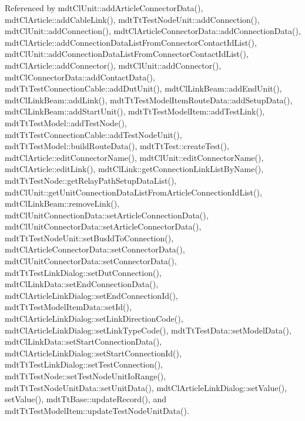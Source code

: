 Referenced by mdt\-Cl\-Unit\-::add\-Article\-Connector\-Data(), mdt\-Cl\-Article\-::add\-Cable\-Link(), mdt\-Tt\-Test\-Node\-Unit\-::add\-Connection(), mdt\-Cl\-Unit\-::add\-Connection(), mdt\-Cl\-Article\-Connector\-Data\-::add\-Connection\-Data(), mdt\-Cl\-Article\-::add\-Connection\-Data\-List\-From\-Connector\-Contact\-Id\-List(), mdt\-Cl\-Unit\-::add\-Connection\-Data\-List\-From\-Connector\-Contact\-Id\-List(), mdt\-Cl\-Article\-::add\-Connector(), mdt\-Cl\-Unit\-::add\-Connector(), mdt\-Cl\-Connector\-Data\-::add\-Contact\-Data(), mdt\-Tt\-Test\-Connection\-Cable\-::add\-Dut\-Unit(), mdt\-Cl\-Link\-Beam\-::add\-End\-Unit(), mdt\-Cl\-Link\-Beam\-::add\-Link(), mdt\-Tt\-Test\-Model\-Item\-Route\-Data\-::add\-Setup\-Data(), mdt\-Cl\-Link\-Beam\-::add\-Start\-Unit(), mdt\-Tt\-Test\-Model\-Item\-::add\-Test\-Link(), mdt\-Tt\-Test\-Model\-::add\-Test\-Node(), mdt\-Tt\-Test\-Connection\-Cable\-::add\-Test\-Node\-Unit(), mdt\-Tt\-Test\-Model\-::build\-Route\-Data(), mdt\-Tt\-Test\-::create\-Test(), mdt\-Cl\-Article\-::edit\-Connector\-Name(), mdt\-Cl\-Unit\-::edit\-Connector\-Name(), mdt\-Cl\-Article\-::edit\-Link(), mdt\-Cl\-Link\-::get\-Connection\-Link\-List\-By\-Name(), mdt\-Tt\-Test\-Node\-::get\-Relay\-Path\-Setup\-Data\-List(), mdt\-Cl\-Unit\-::get\-Unit\-Connection\-Data\-List\-From\-Article\-Connection\-Id\-List(), mdt\-Cl\-Link\-Beam\-::remove\-Link(), mdt\-Cl\-Unit\-Connection\-Data\-::set\-Article\-Connection\-Data(), mdt\-Cl\-Unit\-Connector\-Data\-::set\-Article\-Connector\-Data(), mdt\-Tt\-Test\-Node\-Unit\-::set\-Bus\-Id\-To\-Connection(), mdt\-Cl\-Article\-Connector\-Data\-::set\-Connector\-Data(), mdt\-Cl\-Unit\-Connector\-Data\-::set\-Connector\-Data(), mdt\-Tt\-Test\-Link\-Dialog\-::set\-Dut\-Connection(), mdt\-Cl\-Link\-Data\-::set\-End\-Connection\-Data(), mdt\-Cl\-Article\-Link\-Dialog\-::set\-End\-Connection\-Id(), mdt\-Tt\-Test\-Model\-Item\-Data\-::set\-Id(), mdt\-Cl\-Article\-Link\-Dialog\-::set\-Link\-Direction\-Code(), mdt\-Cl\-Article\-Link\-Dialog\-::set\-Link\-Type\-Code(), mdt\-Tt\-Test\-Data\-::set\-Model\-Data(), mdt\-Cl\-Link\-Data\-::set\-Start\-Connection\-Data(), mdt\-Cl\-Article\-Link\-Dialog\-::set\-Start\-Connection\-Id(), mdt\-Tt\-Test\-Link\-Dialog\-::set\-Test\-Connection(), mdt\-Tt\-Test\-Node\-::set\-Test\-Node\-Unit\-Io\-Range(), mdt\-Tt\-Test\-Node\-Unit\-Data\-::set\-Unit\-Data(), mdt\-Cl\-Article\-Link\-Dialog\-::set\-Value(), set\-Value(), mdt\-Tt\-Base\-::update\-Record(), and mdt\-Tt\-Test\-Model\-Item\-::update\-Test\-Node\-Unit\-Data().

